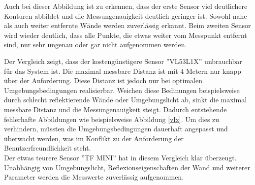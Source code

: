 Auch bei dieser Abbildung ist zu erkennen, dass der erste Sensor viel deutlichere Konturen abbildet und die Messungenauigkeit deutlich geringer ist. Sowohl nahe als auch weiter entfernte Wände werden zuverlässig erkannt. Beim zweiten Sensor wird wieder deutlich, dass alle Punkte, die etwas weiter vom Messpunkt entfernt sind, nur sehr ungenau oder gar nicht aufgenommen werden. 

Der Vergleich zeigt, dass der kostengünstigere Sensor ''VL53L1X'' unbrauchbar für das System ist. Die maximal messbare Distanz ist mit 4 Metern nur knapp über der Anforderung. Diese Distanz ist jedoch nur bei optimalen Umgebungsbedingungen realisierbar. Weichen diese Bedinungen beispielsweise durch schlecht reflektierende Wände oder Umgebungslicht ab, sinkt die maximal messbare Distanz und die Messungenauigkeit steigt.  Dadurch entstehende fehlerhafte Abbildungen wie beispielsweise Abbildung \ref*{vlx}. Um dies zu verhindern, müssten die Umgebungsbedingungen dauerhaft angepasst und überwacht werden, was im Konflikt zu der Anforderung der Benutzerfreundlichkeit steht.\\

Der etwas teurere Sensor ''TF MINI'' hat in diesem Vergleich klar überzeugt. Unabhängig von Umgebungslicht, Reflexionseigenschaften der Wand und weiterer Parameter werden die Messwerte zuverlässig aufgenommen. 







